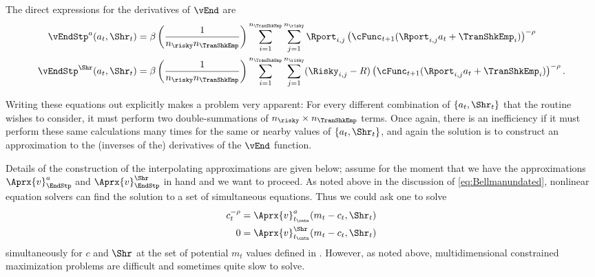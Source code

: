 \documentclass[titlepage, headings=optiontotocandhead]{Resources/texmf-local/tex/latex/econtex}
\begin{document}
The direct expressions for the derivatives of $\vEnd$ are
\begin{equation}\begin{gathered}\begin{aligned}
      \vEndStp^{a}(a_{t},\Shr_{t})  & = \beta \left(\frac{1}{n_{\risky} n_{\TranShkEmp}}\right)\sum_{i=1}^{n_{\TranShkEmp}}\sum_{j=1}^{n_{\risky} }\Rport_{i,j} \left(\cFunc_{t+1}(\Rport_{i,j}a_{t}+\TranShkEmp_{i})\right)^{-\rho}
      \\      \vEndStp^{\Shr}(a_{t},\Shr_{t})  & = \beta \left(\frac{1}{n_{\risky} n_{\TranShkEmp}}\right)\sum_{i=1}^{n_{\TranShkEmp}}\sum_{j=1}^{n_{\risky} }(\Risky_{i,j}-R)\left(\cFunc_{t+1}(\Rport_{i,j}a_{t}+\TranShkEmp_{i})\right)^{-\rho}.
    \end{aligned}\end{gathered}\end{equation}

Writing these equations out explicitly makes a problem very apparent: For every different combination of $\{{a}_{t},\Shr_{t}\}$ that the routine wishes to consider, it must perform two double-summations of $n_{\risky} \times n_{\TranShkEmp}$ terms.  Once again, there is an inefficiency if it must perform these same calculations many times for the same or nearby values of $\{{a}_{t},\Shr_{t}\}$, and again the solution is to construct an approximation to the (inverses of the) derivatives of the $\vEnd$ function.

Details of the construction of the interpolating approximations are given below; assume for the moment that we have the approximations $\Aprx{v}_{\EndStp}^{a}$ and $\Aprx{v}_{\EndStp}^{\Shr}$ in hand and we want to proceed.  As noted above in the discussion of \eqref{eq:Bellmanundated}, nonlinear equation solvers can find the solution to a set of simultaneous equations.  Thus we could ask one to solve
\begin{equation}\begin{gathered}\begin{aligned}
      c_{t}^{-\rho}  & = \Aprx{v}^{a}_{{t_\cntn}}(m_{t}-c_{t},\Shr_{t}) %
      \\      0  & = \Aprx{v}^{\Shr}_{{t_\cntn}}(m_{t}-c_{t},\Shr_{t}) \label{eq:FOCwrtw}
    \end{aligned}\end{gathered}\end{equation}
simultaneously for $c$ and $\Shr$ at the set of potential $m_{t}$ values defined in {\mVec}. However, as noted above, multidimensional constrained
maximization problems are difficult and sometimes quite slow to
solve.
\end{document}
